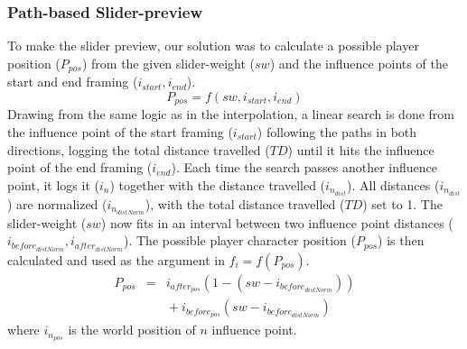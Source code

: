 \subsubsection{Path-based Slider-preview}
To make the slider preview, our solution was to calculate a possible player position ($P_{pos}$) from the given slider-weight ($sw$) and the influence points of the start and end framing ($i_{start}, i_{end}$).
\begin{equation}
P_{pos} = f(sw, i_{start}, i_{end})
\end{equation}
Drawing from the same logic as in the interpolation, a linear search is done from the influence point of the start framing ($i_{start}$) following the paths in both directions, logging the total distance travelled ($TD$) until it hits the influence point of the end framing ($i_{end}$). Each time the search passes another influence point, it logs it ($i_{n}$) together with the distance travelled ($i_{n_{dist}}$). All distances ($i_{n_{dist}}$) are normalized ($i_{n_{distNorm}}$), with the total distance travelled ($TD$) set to 1. The slider-weight ($sw$) now fits in an interval between two influence point distances ($i_{before_{distNorm}}, i_{after_{distNorm}}$). The possible player character position ($P_{pos}$) is then calculated and used as the argument in $f_{i} = f(P_{pos})$.
\begin{eqnarray}
P_{pos} &=& i_{after_{pos}}\left(1 - \left(sw - i_{before_{distNorm}}\right)\right)\nonumber \\
&&\mbox{}+ i_{before_{pos}}\left(sw - i_{before_{distNorm}}\right)
\end{eqnarray}
where $i_{n_{pos}}$ is the world position of $n$ influence point.